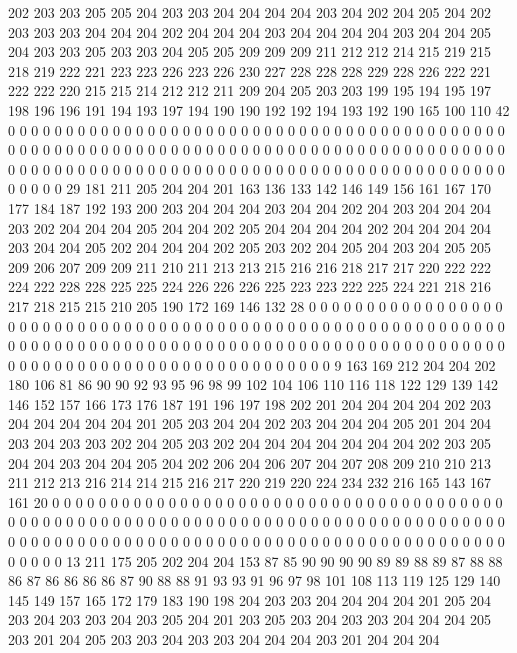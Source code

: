 202 203 203 205 205 204 203 203 204 204 204 204 203 204 202 204 205 204 202 203
203 203 204 204 204 202 204 204 204 203 204 204 204 204 203 204 204 205 204 203
203 205 203 203 204 205 205 209 209 209 211 212 212 214 215 219 215 218 219 222
221 223 223 226 223 226 230 227 228 228 228 229 228 226 222 221 222 222 220 215
215 214 212 212 211 209 204 205 203 203 199 195 194 195 197 198 196 196 191 194
193 197 194 190 190 192 192 194 193 192 190 165 100 110 42 0 0 0 0 0
0 0 0 0 0 0 0 0 0 0 0 0 0 0 0 0 0 0 0 0
0 0 0 0 0 0 0 0 0 0 0 0 0 0 0 0 0 0 0 0
0 0 0 0 0 0 0 0 0 0 0 0 0 0 0 0 0 0 0 0
0 0 0 0 0 0 0 0 0 0 0 0 0 0 0 0 0 0 0 0
0 0 0 0 0 0 0 0 0 0 0 0 0 0 0 0 0 0 0 0
0 0 0 0 0 0 0 0 0 0 0 0 0 0 0 0 0 0 0 0
0 0 0 0 0 0 0 0 0 29 181 211 205 204 204 201 163 136 133 142
146 149 156 161 167 170 177 184 187 192 193 200 203 204 204 204 203 204 204 202
204 203 204 204 204 203 202 204 204 204 205 204 204 202 205 204 204 204 204 202
204 204 204 204 203 204 204 205 202 204 204 204 202 205 203 202 204 205 204 203
204 205 205 209 206 207 209 209 211 210 211 213 213 215 216 216 218 217 217 220
222 222 224 222 228 228 225 225 224 226 226 226 225 223 223 222 225 224 221 218
216 217 218 215 215 210 205 190 172 169 146 132 28 0 0 0 0 0 0 0
0 0 0 0 0 0 0 0 0 0 0 0 0 0 0 0 0 0 0 0
0 0 0 0 0 0 0 0 0 0 0 0 0 0 0 0 0 0 0 0
0 0 0 0 0 0 0 0 0 0 0 0 0 0 0 0 0 0 0 0
0 0 0 0 0 0 0 0 0 0 0 0 0 0 0 0 0 0 0 0
0 0 0 0 0 0 0 0 0 0 0 0 0 0 0 0 0 0 0 0
0 0 0 0 0 0 0 0 0 0 0 0 0 0 0 0 0 0 0 0
0 0 0 0 9 163 169 212 204 204 202 180 106 81 86 90 90 92 93 95
96 98 99 102 104 106 110 116 118 122 129 139 142 146 152 157 166 173 176 187
191 196 197 198 202 201 204 204 204 204 202 203 204 204 204 204 204 201 205 203
204 204 202 203 204 204 204 205 201 204 204 203 204 203 203 202 204 205 203 202
204 204 204 204 204 204 204 202 203 205 204 204 203 204 204 205 204 202 206 204
206 207 204 207 208 209 210 210 213 211 212 213 216 214 214 215 216 217 220 219
220 224 234 232 216 165 143 167 161 20 0 0 0 0 0 0 0 0 0 0
0 0 0 0 0 0 0 0 0 0 0 0 0 0 0 0 0 0 0 0
0 0 0 0 0 0 0 0 0 0 0 0 0 0 0 0 0 0 0 0
0 0 0 0 0 0 0 0 0 0 0 0 0 0 0 0 0 0 0 0
0 0 0 0 0 0 0 0 0 0 0 0 0 0 0 0 0 0 0 0
0 0 0 0 0 0 0 0 0 0 0 0 0 0 0 0 0 0 0 0
0 0 0 0 0 0 0 0 0 0 0 0 0 0 0 0 0 0 0 0
13 211 175 205 202 204 204 153 87 85 90 90 90 90 89 89 88 89 87 88
88 86 87 86 86 86 86 87 90 88 88 91 93 93 91 96 97 98 101 108
113 119 125 129 140 145 149 157 165 172 179 183 190 198 204 203 203 204 204 204
204 201 205 204 203 204 203 203 204 203 205 204 201 203 205 203 204 203 203 204
204 204 205 203 201 204 205 203 203 204 203 203 204 204 204 203 201 204 204 204
